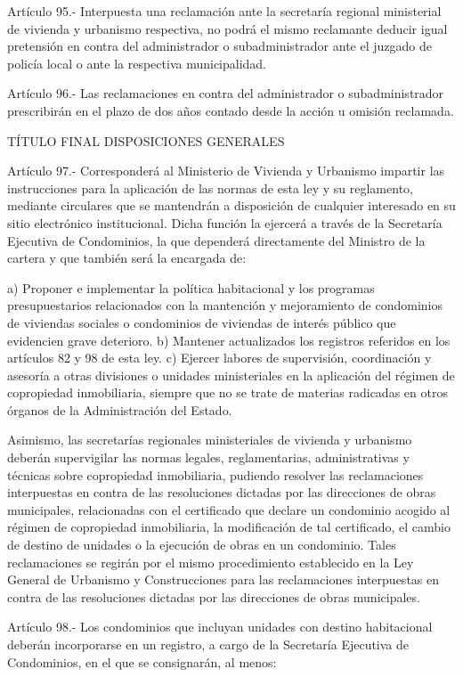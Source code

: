     Artículo 95.- Interpuesta una reclamación ante la secretaría regional ministerial de vivienda y urbanismo respectiva, no podrá el mismo reclamante deducir igual pretensión en contra del administrador o subadministrador ante el juzgado de policía local o ante la respectiva municipalidad.
     
    Artículo 96.- Las reclamaciones en contra del administrador o subadministrador prescribirán en el plazo de dos años contado desde la acción u omisión reclamada.
 
    TÍTULO FINAL
    DISPOSICIONES GENERALES
   
    Artículo 97.- Corresponderá al Ministerio de Vivienda y Urbanismo impartir las instrucciones para la aplicación de las normas de esta ley y su reglamento, mediante circulares que se mantendrán a disposición de cualquier interesado en su sitio electrónico institucional.
    Dicha función la ejercerá a través de la Secretaría Ejecutiva de Condominios, la que dependerá directamente del Ministro de la cartera y que también será la encargada de:
     
    a) Proponer e implementar la política habitacional y los programas presupuestarios relacionados con la mantención y mejoramiento de condominios de viviendas sociales o condominios de viviendas de interés público que evidencien grave deterioro.
    b) Mantener actualizados los registros referidos en los artículos 82 y 98 de esta ley.
    c) Ejercer labores de supervisión, coordinación y asesoría a otras divisiones o unidades ministeriales en la aplicación del régimen de copropiedad inmobiliaria, siempre que no se trate de materias radicadas en otros órganos de la Administración del Estado.
     
    Asimismo, las secretarías regionales ministeriales de vivienda y urbanismo deberán supervigilar las normas legales, reglamentarias, administrativas y técnicas sobre copropiedad inmobiliaria, pudiendo resolver las reclamaciones interpuestas en contra de las resoluciones dictadas por las direcciones de obras municipales, relacionadas con el certificado que declare un condominio acogido al régimen de copropiedad inmobiliaria, la modificación de tal certificado, el cambio de destino de unidades o la ejecución de obras en un condominio. Tales reclamaciones se regirán por el mismo procedimiento establecido en la Ley General de Urbanismo y Construcciones para las reclamaciones interpuestas en contra de las resoluciones dictadas por las direcciones de obras municipales.
     
    Artículo 98.- Los condominios que incluyan unidades con destino habitacional deberán incorporarse en un registro, a cargo de la Secretaría Ejecutiva de Condominios, en el que se consignarán, al menos:
     
